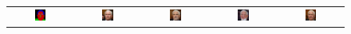 \begin{figure}[]
\begin{tabular} {cc|cc|c}
\includegraphics[width=0.1932\textwidth]{Images/Rec/Faces/label/28054.png} & \includegraphics[width=0.1932\textwidth]{Images/Rec/Faces/gt/28054.jpg} &
\includegraphics[width=0.1932\textwidth]{Images/Rec/Faces/pix2pixhd/28054.jpg}&
\includegraphics[width=0.1932\textwidth]{Images/Rec/Faces/spade/28054.jpg} &  \includegraphics[width=0.1932\textwidth]{Images/Rec/Faces/ours/28054.png} \\




\end{tabular}
\end{figure}
